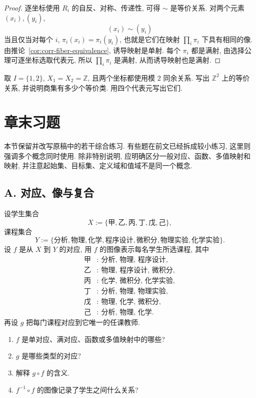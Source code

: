\documentclass[usesamecnt, thmcnt=section, lang=cn, newtx, 10pt, scheme=chinese]{elegantbook}
\begin{document}
\begin{proof}
逐坐标使用 $R_i$ 的自反、对称、传递性, 可得 $\sim$ 是等价关系. 对两个元素 $(x_i),(y_i)$,
\[
 (x_i)\sim(y_i)
\]
当且仅当对每个 $i$, $\pi_i(x_i)=\pi_i(y_i)$, 也就是它们在映射 $\prod_i\pi_i$ 下具有相同的像. 由推论~\ref{cor:corr-fiber-equivalence}, 诱导映射是单射. 每个 $\pi_i$ 都是满射, 由选择公理可逐坐标选取代表元, 所以 $\prod_i\pi_i$ 是满射, 从而诱导映射也是满射.
\end{proof}

\begin{exercise}\label{ex:corr-product-quotient}
取 $I=\{1,2\}$, $X_1=X_2=\mathbb Z$, 且两个坐标都使用模 $2$ 同余关系. 写出 $\mathbb Z^2$ 上的等价关系, 并说明商集有多少个等价类. 用四个代表元写出它们.
\end{exercise}

\section{章末习题}

本节保留并改写原稿中的若干综合练习. 有些题在前文已经拆成较小练习, 这里则强调多个概念同时使用. 除非特别说明, 应明确区分一般对应、函数、多值映射和映射, 并注意起始集、目标集、定义域和值域不是同一个概念.

\subsection*{A. 对应、像与复合}

\begin{exercise}\label{ex:corr-end-01}
设学生集合
\[
 X:=\{\text{甲},\text{乙},\text{丙},\text{丁},\text{戊},\text{己}\},
\]
课程集合
\[
 Y:=\{\text{分析},\text{物理},\text{化学},\text{程序设计},\text{微积分},\text{物理实验},\text{化学实验}\}.
\]
设 $f$ 是从 $X$ 到 $Y$ 的对应, 用 $f$ 的图像表示每名学生所选课程, 其中
\begin{align*}
\text{甲}&:\ \text{分析, 物理, 程序设计},\\
\text{乙}&:\ \text{物理, 程序设计, 微积分},\\
\text{丙}&:\ \text{化学, 微积分, 化学实验},\\
\text{丁}&:\ \text{分析, 物理, 物理实验},\\
\text{戊}&:\ \text{物理, 化学, 微积分},\\
\text{己}&:\ \text{分析, 物理, 化学}.
\end{align*}
再设 $g$ 把每门课程对应到它唯一的任课教师.
\begin{enumerate}[label=\rm(\arabic*)]
  \item $f$ 是单对应、满对应、函数或多值映射中的哪些?
  \item $g$ 是哪些类型的对应?
  \item 解释 $g\circ f$ 的含义.
  \item $f^{-1}\circ f$ 的图像记录了学生之间什么关系?
\end{enumerate}
\end{exercise}
\end{document}

